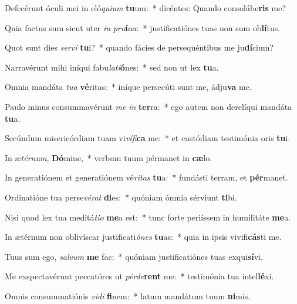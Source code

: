 \item Defecérunt óculi mei in eló\textit{qui}\textit{um} \textbf{tu}um:~* dicéntes: Quando consolábe\textbf{ris} me?
\item Quia factus sum sicut uter \textit{in} \textit{pru}\textbf{í}na:~* justificatiónes tuas non sum ob\textbf{lí}tus.
\item Quot sunt dies \textit{ser}\textit{vi} \textbf{tu}i?~* quando fácies de persequéntibus me ju\textbf{dí}cium?
\item Narravérunt mihi iníqui fabu\textit{la}\textit{ti}\textbf{ó}nes:~* sed non ut lex \textbf{tu}a.
\item Omnia mandáta \textit{tu}\textit{a} \textbf{vé}ritas:~* iníque persecúti sunt me, ádju\textbf{va} me.
\item Paulo minus consummavérunt \textit{me} \textit{in} \textbf{ter}ra:~* ego autem non derelíqui mandáta \textbf{tu}a.
\item Secúndum misericórdiam tuam vi\textit{ví}\textit{fi}\textbf{ca} me:~* et custódiam testimónia oris \textbf{tu}i.
\item In æ\textit{tér}\textit{num}, \textbf{Dó}mine,~* verbum tuum pérmanet in \textbf{cæ}lo.
\item In generatiónem et generatiónem vé\textit{ri}\textit{tas} \textbf{tu}a:~* fundásti terram, et \textbf{pér}manet.
\item Ordinatióne tua perse\textit{vé}\textit{rat} \textbf{di}es:~* quóniam ómnia sérviunt \textbf{ti}bi.
\item Nisi quod lex tua meditá\textit{ti}\textit{o} \textbf{me}a est:~* tunc forte periíssem in humilitáte \textbf{me}a.
\item In ætérnum non oblivíscar justificati\textit{ó}\textit{nes} \textbf{tu}as:~* quia in ipsis vivifi\textbf{cás}ti me.
\item Tuus sum ego, \textit{sal}\textit{vum} \textbf{me} fac:~* quóniam justificatiónes tuas exqui\textbf{sí}vi.
\item Me exspectavérunt peccatóres ut \textit{pér}\textit{de}\textbf{rent} me:~* testimónia tua intel\textbf{lé}xi.
\item Omnis consummatiónis \textit{vi}\textit{di} \textbf{fi}nem:~* latum mandátum tuum \textbf{ni}mis.

